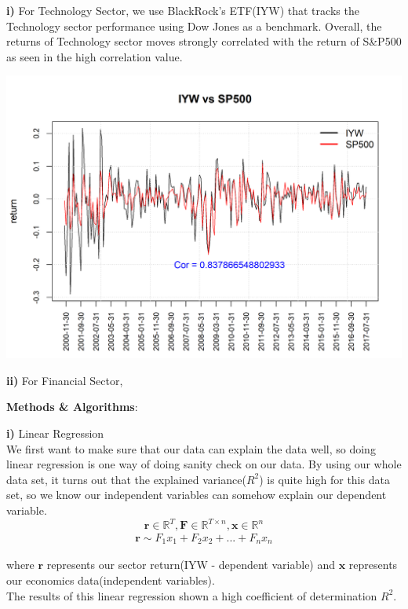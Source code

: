 \documentclass[12pt]{amsart}
\newcommand{\R}{\mathbb{R}}
\begin{document}
\textbf{i)} For Technology Sector, we use BlackRock's ETF(IYW) that tracks the Technology sector performance using Dow Jones as a benchmark. Overall, the returns of Technology sector moves strongly correlated with the return of S\&P500 as seen in the high correlation value.
\begin{center}
	\includegraphics[scale=0.7]{IYW_vs_SP500}
\end{center}

\textbf{ii)} For Financial Sector,
\vskip 8pt \noindent


\newpage

\vskip 8pt \noindent
{\textbf{Methods \& Algorithms}: }
\vskip 8pt \noindent

\textbf{i)} Linear Regression\\
We first want to make sure that our data can explain the data well, so doing linear regression is one way of doing sanity check on our data. By using our whole data set, it turns out that the explained variance($R^{2}$) is quite high for this data set, so we know our independent variables can somehow explain our dependent variable. 
\[ \mathbf{r} \in \R^{T}, \mathbf{F} \in \R^{T \times n}, \mathbf{x} \in \R^{n}
\]
\begin{align*}
\mathbf{r} \sim F_{1}x_{1} + F_{2}x_{2} + ... + F_{n}x_{n}
\end{align*}

where $\mathbf{r}$ represents our sector return(IYW - dependent variable) and $\mathbf{x}$ represents our economics data(independent variables).\\
The results of this linear regression shown a high coefficient of determination $R^{2}$.
\end{document}
